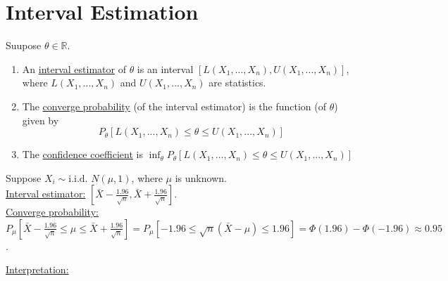 \documentclass[11pt]{elegantbook}
\begin{document}
\section{Interval Estimation}
\begin{definition}
    \normalfont
    Suupose $\theta\in \mathbb{R}$.
    \begin{enumerate}
        \item An \underline{interval estimator} of $\theta$ is an interval $\left[L(X_1,...,X_n),U(X_1,...,X_n)\right]$, where $L(X_1,...,X_n)$ and $U(X_1,...,X_n)$ are statistics.
        \item The \underline{converge probability} (of the interval estimator) is the function (of $\theta$) given by $$P_\theta\left[L(X_1,...,X_n)\leq\theta\leq U(X_1,...,X_n)\right]$$
        \item The \underline{confidence coefficient} is $\inf_{\theta}P_\theta\left[L(X_1,...,X_n)\leq\theta\leq U(X_1,...,X_n)\right]$
    \end{enumerate}
\end{definition}
\begin{example}
    Suppose $X_i\sim \text{i.i.d. }N(\mu,1)$, where $\mu$ is unknown.\\
    \underline{Interval estimator:} $\left[\bar{X}-\frac{1.96}{\sqrt{n}},\bar{X}+\frac{1.96}{\sqrt{n}}\right]$.\\
    \underline{Converge probability:} $P_\mu\left[\bar{X}-\frac{1.96}{\sqrt{n}}\leq\mu\leq\bar{X}+\frac{1.96}{\sqrt{n}}\right]=P_\mu\left[-1.96\leq\sqrt{n}(\bar{X}-\mu)\leq 1.96\right]=\Phi(1.96)-\Phi(-1.96)\approx 0.95$.
\end{example}
\underline{Interpretation:}
\end{document}
